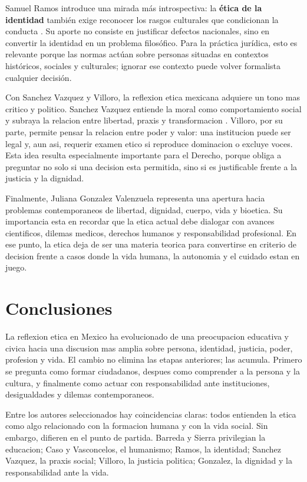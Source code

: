 \documentclass[
	spanish,
	letterpaper, oneside
]{article}
\begin{document}
Samuel Ramos introduce una mirada más introspectiva: la \textbf{ética de la identidad} también exige reconocer los rasgos culturales que condicionan la conducta \citep{ramosPerfil1934}. Su aporte no consiste en justificar defectos nacionales, sino en convertir la identidad en un problema filosófico. Para la práctica jurídica, esto es relevante porque las normas actúan sobre personas situadas en contextos históricos, sociales y culturales; ignorar ese contexto puede volver formalista cualquier decisión.

Con Sanchez Vazquez y Villoro, la reflexion etica mexicana adquiere un tono mas critico y politico. Sanchez Vazquez entiende la moral como comportamiento social y subraya la relacion entre libertad, praxis y transformacion \citep{sanchezVazquezEtica1969}. Villoro, por su parte, permite pensar la relacion entre poder y valor: una institucion puede ser legal y, aun asi, requerir examen etico si reproduce dominacion o excluye voces. Esta idea resulta especialmente importante para el Derecho, porque obliga a preguntar no solo si una decision esta permitida, sino si es justificable frente a la justicia y la dignidad.

Finalmente, Juliana Gonzalez Valenzuela representa una apertura hacia problemas contemporaneos de libertad, dignidad, cuerpo, vida y bioetica. Su importancia esta en recordar que la etica actual debe dialogar con avances cientificos, dilemas medicos, derechos humanos y responsabilidad profesional. En ese punto, la etica deja de ser una materia teorica para convertirse en criterio de decision frente a casos donde la vida humana, la autonomia y el cuidado estan en juego.

\section{Conclusiones}

La reflexion etica en Mexico ha evolucionado de una preocupacion educativa y civica hacia una discusion mas amplia sobre persona, identidad, justicia, poder, profesion y vida. El cambio no elimina las etapas anteriores; las acumula. Primero se pregunta como formar ciudadanos, despues como comprender a la persona y la cultura, y finalmente como actuar con responsabilidad ante instituciones, desigualdades y dilemas contemporaneos.

Entre los autores seleccionados hay coincidencias claras: todos entienden la etica como algo relacionado con la formacion humana y con la vida social. Sin embargo, difieren en el punto de partida. Barreda y Sierra privilegian la educacion; Caso y Vasconcelos, el humanismo; Ramos, la identidad; Sanchez Vazquez, la praxis social; Villoro, la justicia politica; Gonzalez, la dignidad y la responsabilidad ante la vida.
\end{document}
